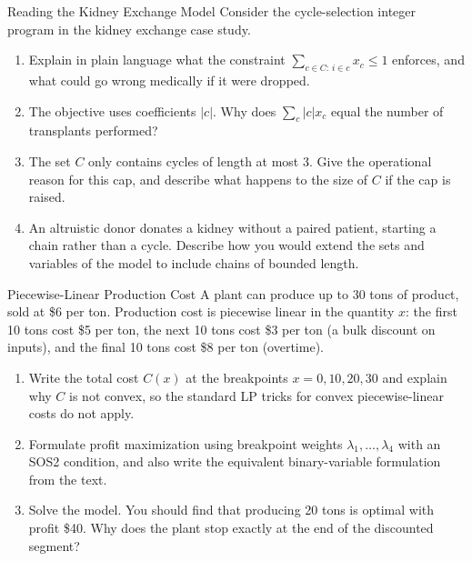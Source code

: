 \begin{ex}{Reading the Kidney Exchange Model}{}
\label{ex:kidney-model}
 Consider the cycle-selection integer program in the kidney exchange case study.
\begin{enumerate}
\item Explain in plain language what the constraint $\sum_{c \in C:\, i \in c} x_c \leq 1$ enforces, and what could go wrong medically if it were dropped.
\item The objective uses coefficients $|c|$.  Why does $\sum_{c} |c| x_c$ equal the number of transplants performed?
\item The set $C$ only contains cycles of length at most 3.  Give the operational reason for this cap, and describe what happens to the size of $C$ if the cap is raised.
\item An altruistic donor donates a kidney without a paired patient, starting a chain rather than a cycle.  Describe how you would extend the sets and variables of the model to include chains of bounded length.
\end{enumerate}
\end{ex}


\begin{ex}{Piecewise-Linear Production Cost}{}
\label{ex:pwl-challenge}
 A plant can produce up to 30 tons of product, sold at \$6 per ton.  Production cost is piecewise linear in the quantity $x$: the first 10 tons cost \$5 per ton, the next 10 tons cost \$3 per ton (a bulk discount on inputs), and the final 10 tons cost \$8 per ton (overtime).
\begin{enumerate}
\item Write the total cost $C(x)$ at the breakpoints $x = 0, 10, 20, 30$ and explain why $C$ is not convex, so the standard LP tricks for convex piecewise-linear costs do not apply.
\item Formulate profit maximization using breakpoint weights $\lambda_1, \dots, \lambda_4$ with an SOS2 condition, and also write the equivalent binary-variable formulation from the text.
\item Solve the model.  You should find that producing 20 tons is optimal with profit \$40.  Why does the plant stop exactly at the end of the discounted segment?
\end{enumerate}
\end{ex}

